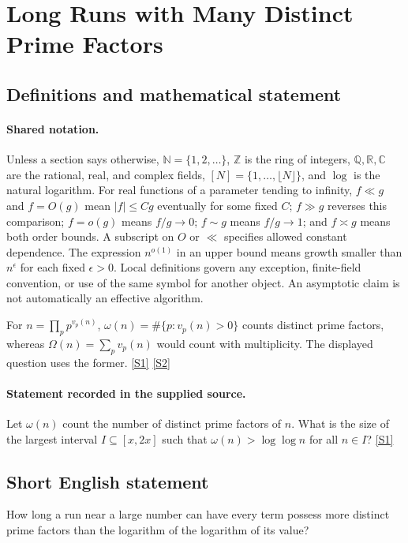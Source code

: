 \documentclass[11pt,a4paper]{article}
\newcommand{\N}{\mathbb{N}}
\newcommand{\Z}{\mathbb{Z}}
\newcommand{\Q}{\mathbb{Q}}
\newcommand{\R}{\mathbb{R}}
\newcommand{\C}{\mathbb{C}}
\newcommand{\sref}[2]{\hyperlink{source:#1:#2}{[S#2]}}
\begin{document}
\section{Long Runs with Many Distinct Prime Factors}\label{statement}


\subsection{Definitions and mathematical statement}

\paragraph{Shared notation.}Unless a section says otherwise, $\N=\{1,2,\ldots\}$,
$\Z$ is the ring of integers, $\Q,\R,\C$ are the rational, real, and complex
fields, $[N]=\{1,\ldots,\lfloor N\rfloor\}$, and $\log$ is the natural
logarithm. For real functions of a parameter tending to infinity,
$f\ll g$ and $f=O(g)$ mean $|f|\leq Cg$ eventually for some fixed $C$;
$f\gg g$ reverses this comparison; $f=o(g)$ means $f/g\to0$;
$f\sim g$ means $f/g\to1$; and $f\asymp g$ means both order bounds.
A subscript on $O$ or $\ll$ specifies allowed constant dependence.
The expression $n^{o(1)}$ in an upper bound means growth smaller than
$n^\epsilon$ for each fixed $\epsilon>0$. Local definitions govern any
exception, finite-field convention, or use of the same symbol for another
object. An asymptotic claim is not automatically an effective algorithm.



For $n=\prod_pp^{v_p(n)}$, $\omega(n)=\#\{p:v_p(n)>0\}$ counts distinct prime factors, whereas $\Omega(n)=\sum_pv_p(n)$ would count with multiplicity. The displayed question uses the former. \sref{statement}{1} \sref{statement}{2}

\paragraph{Statement recorded in the supplied source.}
Let $\omega(n)$ count the number of distinct prime factors of $n$. What is the size of the largest interval $I\subseteq [x,2x]$ such that $\omega(n)>\log\log n$ for all $n\in I$? \sref{statement}{1}

\subsection{Short English statement}

How long a run near a large number can have every term possess more distinct prime factors than the logarithm of the logarithm of its value?
\end{document}
